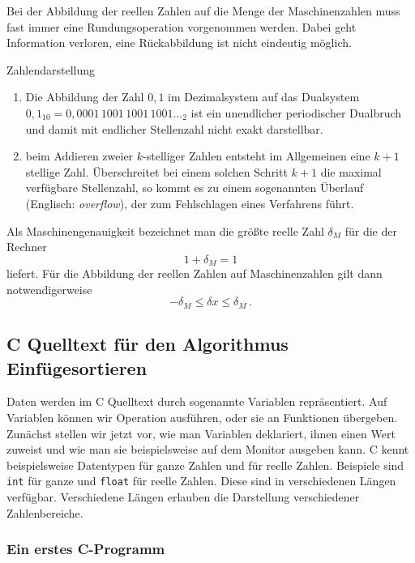Bei der Abbildung der reellen Zahlen auf die Menge der Maschinenzahlen
muss fast immer eine Rundungsoperation vorgenommen werden. Dabei geht
Information verloren, eine Rückabbildung ist nicht eindeutig möglich.

\begin{myexampleblock}{Zahlendarstellung}
  \begin{enumerate}
    \item Die Abbildung der Zahl $0{,}1$ im Dezimalsystem auf das
    Dualsystem $0{,}1_{10} = 0{,}0001\,1001\,1001\,1001\ldots_2$ ist ein unendlicher
    periodischer Dualbruch und damit mit endlicher Stellenzahl nicht
    exakt darstellbar.
  \item beim Addieren zweier $k$-stelliger Zahlen entsteht im
    Allgemeinen eine $k+1$ stellige Zahl. Überschreitet bei einem
    solchen Schritt $k+1$ die maximal verfügbare Stellenzahl, so kommt
    es zu einem sogenannten Überlauf (Englisch: \emph{overflow}), der
    zum Fehlschlagen eines Verfahrens führt.
  \end{enumerate}
\end{myexampleblock}
Als Maschinengenauigkeit bezeichnet man die größte reelle Zahl
$\delta_M$ für die der Rechner
\begin{equation}
1 + \delta_M = 1
\end{equation}
liefert. Für die Abbildung der reellen Zahlen auf Maschinenzahlen gilt
dann notwendigerweise
\begin{equation}
-\delta_M \leq \delta x\leq \delta_M\,.
\end{equation}


\subsection{C Quelltext für den Algorithmus Einfügesortieren}

Daten werden im C Quelltext durch sogenannte Variablen repräsentiert. 
Auf Variablen können wir Operation ausführen, oder sie an Funktionen übergeben.
Zunächst stellen wir jetzt vor, wie man Variablen deklariert, ihnen einen Wert zuweist und wie man sie beispielsweise auf dem Monitor ausgeben kann.
C kennt beispielsweise Datentypen für ganze Zahlen und für reelle Zahlen.
Beispiele sind \texttt{int} für ganze und \texttt{float} für reelle Zahlen.
Diese sind in verschiedenen Längen verfügbar.
Verschiedene Längen erlauben die Darstellung verschiedener Zahlenbereiche.

\subsubsection{Ein erstes C-Programm}

